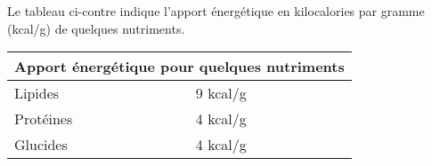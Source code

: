 
\medskip

\begin{minipage}{7cm}
Le tableau ci-contre indique l'apport énergétique en kilocalories par gramme (kcal/g) de quelques nutriments.
\end{minipage}
\hspace{0.5cm}\begin{minipage}{7cm}
\begin{tabularx}{\linewidth}{|X|X|}\hline
\multicolumn{2}{|c|}{\small Apport énergétique pour quelques nutriments}\\ \hline   
Lipides   	&9 kcal/g \\ \hline  
Protéines  	&4 kcal/g\\ \hline   
Glucides   	&4 kcal/g \\ \hline
\end{tabularx}  
\end{minipage}

